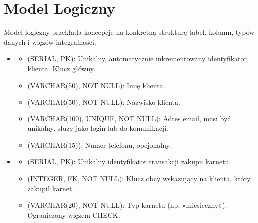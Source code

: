 \documentclass[letterpaper,10pt,polish]{sphinxmanual}
\begin{document}
\section{Model Logiczny}
\label{\detokenize{rozdzial3/rozdzial3:model-logiczny}}
\sphinxAtStartPar
Model logiczny przekłada koncepcje na konkretną strukturę tabel, kolumn, typów danych i więzów integralności.
\begin{itemize}
\item {} \begin{description}
\begin{itemize}
\item {} 
\sphinxAtStartPar
{} (SERIAL, PK): Unikalny, automatycznie inkrementowany identyfikator klienta. Klucz główny.

\item {} 
\sphinxAtStartPar
{} (VARCHAR(50), NOT NULL): Imię klienta.

\item {} 
\sphinxAtStartPar
{} (VARCHAR(50), NOT NULL): Nazwisko klienta.

\item {} 
\sphinxAtStartPar
{} (VARCHAR(100), UNIQUE, NOT NULL): Adres e\sphinxhyphen{}mail, musi być unikalny, służy jako login lub do komunikacji.

\item {} 
\sphinxAtStartPar
{} (VARCHAR(15)): Numer telefonu, opcjonalny.

\end{itemize}

\end{description}

\item {} \begin{description}
\begin{itemize}
\item {} 
\sphinxAtStartPar
{} (SERIAL, PK): Unikalny identyfikator transakcji zakupu karnetu.

\item {} 
\sphinxAtStartPar
{} (INTEGER, FK, NOT NULL): Klucz obcy wskazujący na klienta, który zakupił karnet.

\item {} 
\sphinxAtStartPar
{} (VARCHAR(20), NOT NULL): Typ karnetu (np. «miesieczny»). Ograniczony więzem CHECK.


\end{itemize}
\end{description}
\end{itemize}
\end{document}
